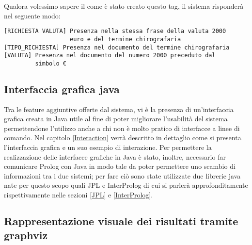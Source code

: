 Qualora volessimo sapere il come è stato creato questo tag, il sistema risponderà nel seguente modo:

\begin{verbatim}
[RICHIESTA VALUTA] Presenza nella stessa frase della valuta 2000
                   euro e del termine chirografaria
[TIPO_RICHIESTA] Presenza nel documento del termine chirografaria
[VALUTA] Presenza nel documento del numero 2000 preceduto dal 
         simbolo €
\end{verbatim}
\subsection{Interfaccia grafica java}
Tra le feature aggiuntive offerte dal sistema, vi è la presenza di un'interfaccia grafica creata in Java utile al fine di poter migliorare l'usabilità del sistema permettendone l'utilizzo anche a chi non è molto pratico di interfacce a linee di comando. Nel capitolo \ref{Interaction} verrà descritto in dettaglio come si presenta l'interfaccia grafica e un suo esempio di interazione. 
Per permettere la realizzazione delle interfacce grafiche in Java è stato, inoltre, necessario far comunicare Prolog con Java in modo tale da poter permettere uno scambio di informazioni tra i due sistemi; per fare ciò sono state utilizzate due librerie java nate per questo scopo quali JPL e InterProlog di cui si parlerà approfonditamente rispettivamente nelle sezioni \ref{JPL} e \ref{InterProlog}.
\subsection{Rappresentazione visuale dei risultati tramite graphviz}
\clearpage